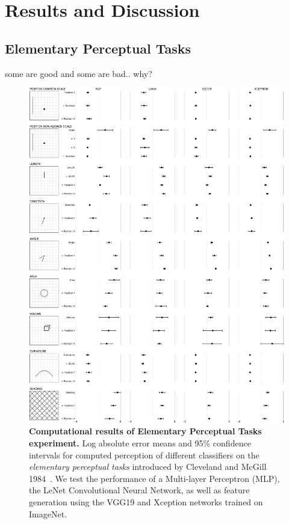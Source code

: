 \documentclass[journal]{vgtc}                %
\begin{document}
\section{Results and Discussion}

\subsection{Elementary Perceptual Tasks}

some are good and some are bad.. why?

\begin{figure}[h]
	  \includegraphics[width=\linewidth]{figure1.pdf}
  \caption{\textbf{Computational results of Elementary Perceptual Tasks experiment.} Log absolute error means and 95\% confidence intervals for computed perception of different classifiers on the \emph{elementary perceptual tasks} introduced by Cleveland and McGill 1984~\cite{cleveland_mcgill}. We test the performance of a Multi-layer Perceptron (MLP), the LeNet Convolutional Neural Network, as well as feature generation using the VGG19 and Xception networks trained on ImageNet.}
	\label{fig:figure1_results}
\end{figure}
\end{document}
